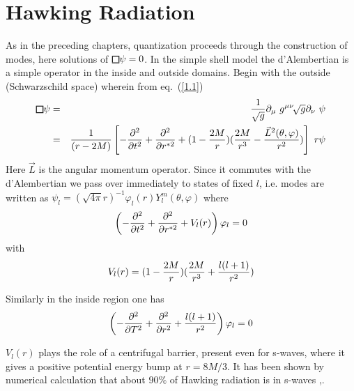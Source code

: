 \documentclass[12pt,oneside]{report}
\def\sqr#1#2{{\vcenter{\vbox{\hrule height.#2pt
          \hbox{\vrule width.#2pt height#1pt \kern#1pt
           \vrule width.#2pt}
           \hrule height.#2pt}}}}
\def\square{\mathchoice\sqr68\sqr68\sqr{4.2}6\sqr{3}6}
\begin{document}
\section {Hawking Radiation}\label{hawking}

As in the preceding chapters, quantization proceeds through the construction of
modes, here solutions of $\square \psi = 0$. In the simple shell
model the d'Alembertian is a simple operator in the inside and outside
domains. Begin with the outside (Schwarzschild space) wherein from
eq.~(\ref {1.1})
 \begin{eqnarray}
\square \psi &=& {1 \over \sqrt{g}} \partial_\mu\  g^{\mu\nu}\!\sqrt{g}
\partial_\nu \ \psi \nonumber\\
&=&{1\over (r-2M)} \left[
-{\partial^2 \over \partial t^2} + 
{\partial^2 \over \partial r^{*2}}
+ (1- {2M \over r})({2M \over r^3} - {{\vec L}^2(\theta, \varphi) \over r^2})
\right]\  r \psi
\nonumber\\
\label{HR1}
\end{eqnarray}
Here $\vec L$ is the angular momentum operator. Since it commutes
with the d'Alembertian we pass over immediately to states of fixed $l$, i.e. 
modes are written as $ \psi_l=(\sqrt{4 \pi}
 r)^{-1} \varphi_l(r) Y^m_l(\theta ,
\varphi)$ where
\begin{equation}
\left( -{\partial^2 \over \partial t^2} + 
{\partial^2 \over \partial r^{*2}}
+ V_l(r)
\right)  \varphi_l=0
\label{HR2}
\end{equation}
with
\begin{equation}
 V_l(r)
= (1 - {2M\over r})({2M \over r^3} + {l(l+1)\over r^2})
\label{HR3}
\end{equation}

Similarly in the inside region one has
\begin{equation}
\left(-{\partial^2 \over \partial T^2} + 
{\partial^2 \over \partial r^2}
+ {l(l+1)\over r^2}
\right)  \varphi_l=0
\label{HR2BB}
\end{equation}

$V_l(r)$ plays the role of a centrifugal barrier, present even for
s-waves, where it gives a positive potential energy bump at
$r = 8M/3$. It has been shown by numerical calculation that about 
$90\% $ of Hawking radiation is in s-waves \cite{page},\cite{Sanch}. 
\end{document}
